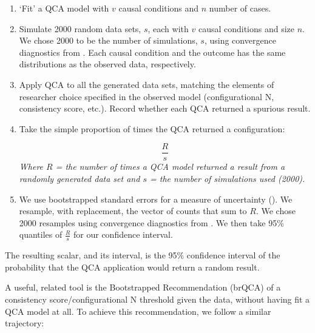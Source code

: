 \documentclass[12pt]{article}
\begin{document}
{\begin{enumerate}
  \item `Fit' a QCA model with $v$ causal conditions and $n$ number of cases. 
  \item Simulate 2000 random data sets, $s$, each with $v$ causal conditions and size $n$. We chose 2000 to be the number of simulations, $s$, using convergence diagnostics from \cite{gelman_and_rubin_1992}. Each causal condition and the outcome has the same distributions as the observed data, respectively. 
  \item Apply QCA to all the generated data sets, matching the elements of researcher choice specified in the observed model (configurational N, consistency score, etc.). Record whether each QCA returned a spurious result.  
  \item Take the simple proportion of times the QCA returned a configuration: 
  \begin{center}
  \[
  \frac{R}{s} 
  \]
  {\it{Where $R$ = the number of times a QCA model returned a result from a randomly generated data set and $s$ = the number of simulations used (2000)}.}
  \end{center}
  \item We use bootstrapped standard errors for a measure of uncertainty (\citealt{efron_and_tibshirani_1994}). We resample, with replacement, the vector of counts that sum to $R$. We chose 2000 resamples using convergence diagnostics from \citet{gelman_and_rubin_1992}. We then take 95\% quantiles of  $\frac{R}{s}$ for our confidence interval.
\end{enumerate}


The resulting scalar, and its interval, is the 95\% confidence interval of the probability that the QCA application would return a random result. 

A useful, related tool is the Bootstrapped Recommendation (brQCA) of a consistency score/configurational N threshold given the data, without having fit a QCA model at all. To achieve this recommendation, we follow a similar trajectory: 

}
\end{document}
